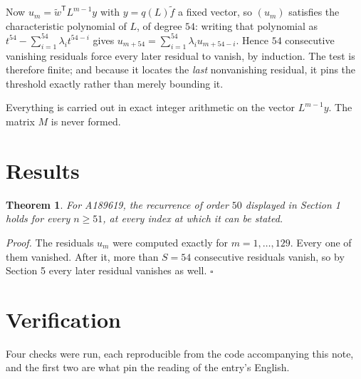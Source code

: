 \documentclass[11pt]{article}
\newtheorem{theorem}{Theorem}
\theoremstyle{definition}
\begin{document}
Now $u_m = \tilde w^{\mathsf T} L^{m-1} y$ with $y = q(L)\tilde f$ a fixed vector, so $(u_m)$ satisfies the characteristic polynomial of $L$, of degree $54$: writing that polynomial as $t^{54} - \sum_{i=1}^{54} \lambda_i t^{54-i}$ gives $u_{m+54} = \sum_{i=1}^{54} \lambda_i u_{m+54-i}$. Hence $54$ consecutive vanishing residuals force every later residual to vanish, by induction. The test is therefore finite; and because it locates the {\itshape last} nonvanishing residual, it pins the threshold exactly rather than merely bounding it.

Everything is carried out in exact integer arithmetic on the vector $L^{m-1}y$. The matrix $M$ is never formed.

\section{Results}

\begin{theorem} For A189619, the recurrence of order $50$ displayed in Section 1 holds for every $n \ge 51$, at every index at which it can be stated.\end{theorem}

{\itshape Proof.} The residuals $u_m$ were computed exactly for $m = 1,\dots,129$. Every one of them vanished. After it, more than $S = 54$ consecutive residuals vanish, so by Section 5 every later residual vanishes as well. $\square$

\section{Verification}

Four checks were run, each reproducible from the code accompanying this note, and the first two are what pin the reading of the entry's English.
\end{document}
